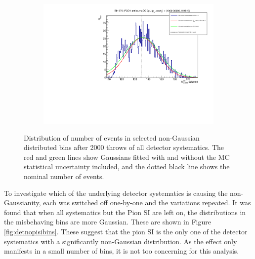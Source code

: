 \begin{figure}[h]
\begin{subfigure}{.49\textwidth}
\end{subfigure}
\begin{subfigure}{.49\textwidth}
  \centering
  \includegraphics[width=0.95\linewidth]{figs/detbin_allsysts570}
\end{subfigure}
\caption{Distribution of number of events in selected non-Gaussian distributed bins after 2000 throws of all detector systematics. The red and green lines show Gaussians fitted with and without the MC statistical uncertainty included, and the dotted black line shows the nominal number of events.}
\label{fig:detnongaussbins}
\end{figure}

To investigate which of the underlying detector systematics is causing the non-Gaussianity, each was switched off one-by-one and the variations repeated. It was found that when all systematics but the Pion SI are left on, the distributions in the misbehaving bins are more Gaussian. These are shown in Figure \ref{fig:detnopisibins}. These suggest that the pion SI is the only one of the detector systematics with a significantly non-Gaussian distribution. As the effect only manifests in a small number of bins, it is not too concerning for this analysis.


